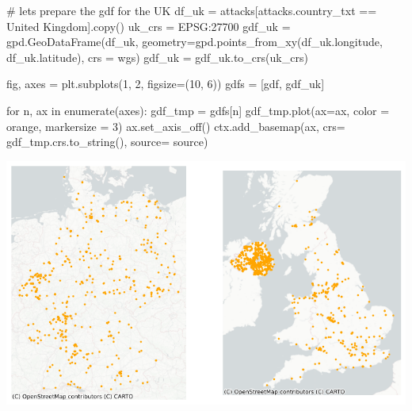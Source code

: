 \documentclass[
  letterpaper,
  DIV=11,
  numbers=noendperiod]{scrreprt}
\newenvironment{Shaded}{\begin{snugshade}}{\end{snugshade}}
\newcommand{\BuiltInTok}[1]{\textcolor[rgb]{0.00,0.23,0.31}{#1}}
\newcommand{\CommentTok}[1]{\textcolor[rgb]{0.37,0.37,0.37}{#1}}
\newcommand{\ControlFlowTok}[1]{\textcolor[rgb]{0.00,0.23,0.31}{#1}}
\newcommand{\DecValTok}[1]{\textcolor[rgb]{0.68,0.00,0.00}{#1}}
\newcommand{\KeywordTok}[1]{\textcolor[rgb]{0.00,0.23,0.31}{#1}}
\newcommand{\NormalTok}[1]{\textcolor[rgb]{0.00,0.23,0.31}{#1}}
\newcommand{\OperatorTok}[1]{\textcolor[rgb]{0.37,0.37,0.37}{#1}}
\newcommand{\StringTok}[1]{\textcolor[rgb]{0.13,0.47,0.30}{#1}}
\begin{document}
\begin{Shaded}
\begin{Highlighting}[]
\CommentTok{\# let\textquotesingle{}s prepare the gdf for the UK}
\NormalTok{df\_uk }\OperatorTok{=}\NormalTok{ attacks[attacks.country\_txt }\OperatorTok{==} \StringTok{\textquotesingle{}United Kingdom\textquotesingle{}}\NormalTok{].copy()}
\NormalTok{uk\_crs }\OperatorTok{=} \StringTok{\textquotesingle{}EPSG:27700\textquotesingle{}}
\NormalTok{gdf\_uk }\OperatorTok{=}\NormalTok{ gpd.GeoDataFrame(df\_uk, geometry}\OperatorTok{=}\NormalTok{gpd.points\_from\_xy(df\_uk.longitude, df\_uk.latitude), crs }\OperatorTok{=}\NormalTok{ wgs)}
\NormalTok{gdf\_uk }\OperatorTok{=}\NormalTok{ gdf\_uk.to\_crs(uk\_crs)}
\end{Highlighting}
\end{Shaded}

\begin{Shaded}
\begin{Highlighting}[]
\NormalTok{fig, axes }\OperatorTok{=}\NormalTok{ plt.subplots(}\DecValTok{1}\NormalTok{, }\DecValTok{2}\NormalTok{, figsize}\OperatorTok{=}\NormalTok{(}\DecValTok{10}\NormalTok{, }\DecValTok{6}\NormalTok{))}
\NormalTok{gdfs }\OperatorTok{=}\NormalTok{ [gdf, gdf\_uk]}

\ControlFlowTok{for}\NormalTok{ n, ax }\KeywordTok{in} \BuiltInTok{enumerate}\NormalTok{(axes):}
\NormalTok{    gdf\_tmp }\OperatorTok{=}\NormalTok{ gdfs[n]}
\NormalTok{    gdf\_tmp.plot(ax}\OperatorTok{=}\NormalTok{ax, color }\OperatorTok{=} \StringTok{\textquotesingle{}orange\textquotesingle{}}\NormalTok{, markersize }\OperatorTok{=} \DecValTok{3}\NormalTok{)}
\NormalTok{    ax.set\_axis\_off()}
\NormalTok{    ctx.add\_basemap(ax, crs}\OperatorTok{=}\NormalTok{ gdf\_tmp.crs.to\_string(), source}\OperatorTok{=}\NormalTok{ source)}
\end{Highlighting}
\end{Shaded}

\includegraphics{labs/w02_maps_files/figure-pdf/cell-23-output-1.png}
\end{document}
